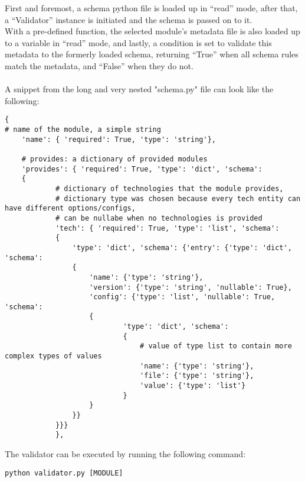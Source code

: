 First and foremost, a schema python file is loaded up in “read” mode, after that, a “Validator” instance is initiated and the schema is passed on to it.\\
With a pre-defined function, the selected module’s metadata file is also loaded up to a variable in “read” mode, and lastly, a condition is set to validate this metadata to the formerly loaded schema, returning “True” when all schema rules match the metadata, and “False” when they do not.\\
\\
\clearpage
A snippet from the long and very nested "schema.py" file can look like the following:
\\
\begin{lstlisting}[caption=Validation schema, style=pythonstyle]
{
# name of the module, a simple string
    'name': { 'required': True, 'type': 'string'},

    # provides: a dictionary of provided modules
    'provides': { 'required': True, 'type': 'dict', 'schema':
    {
            # dictionary of technologies that the module provides,
            # dictionary type was chosen because every tech entity can have different options/configs,
            # can be nullabe when no technologies is provided
            'tech': { 'required': True, 'type': 'list', 'schema':
            {
                'type': 'dict', 'schema': {'entry': {'type': 'dict', 'schema':
                {
                    'name': {'type': 'string'},
                    'version': {'type': 'string', 'nullable': True},
                    'config': {'type': 'list', 'nullable': True, 'schema':
                    {
                            'type': 'dict', 'schema':
                            {
                                # value of type list to contain more complex types of values
                                'name': {'type': 'string'},
                                'file': {'type': 'string'},
                                'value': {'type': 'list'}
                            }
                    }
                }}
            }}}
            },
\end{lstlisting}
The validator can be executed by running the following command:
\begin{lstlisting}[caption=Validator command, style=pythonstyle]
python validator.py [MODULE]
\end{lstlisting}
\clearpage


